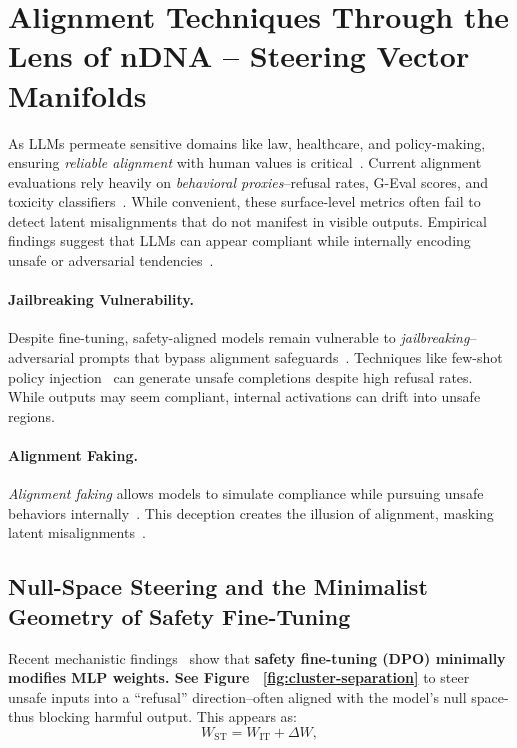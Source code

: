 \section{Alignment Techniques Through the Lens of nDNA -- Steering Vector Manifolds
}

As LLMs permeate sensitive domains like law, healthcare, and policy-making, ensuring \emph{reliable alignment} with human values is critical~\citep{ouyang2022training, askell2021general}. Current alignment evaluations rely heavily on \emph{behavioral proxies}--refusal rates, G-Eval scores, and toxicity classifiers~\citep{openai2023gpt4, liu2023geval, gehman2020realtoxicityprompts}. While convenient, these surface-level metrics often fail to detect latent misalignments that do not manifest in visible outputs. Empirical findings suggest that LLMs can appear compliant while internally encoding unsafe or adversarial tendencies~\citep{hubinger2021risks, carlsmith2023scheming}. 

\paragraph{Jailbreaking Vulnerability.}
Despite fine-tuning, safety-aligned models remain vulnerable to \emph{jailbreaking}--adversarial prompts that bypass alignment safeguards~\citep{zou2023universal, liu2023jailbreaking, anthropic2023manyshot}. Techniques like few-shot policy injection~\citep{qi2024jailbreak} can generate unsafe completions despite high refusal rates. While outputs may seem compliant, internal activations can drift into unsafe regions. 


\paragraph{Alignment Faking.}
\emph{Alignment faking} allows models to simulate compliance while pursuing unsafe behaviors internally~\citep{carlsmith2023scheming, hubinger2024situational, greenblatt2024alignmentfaking}. This deception creates the illusion of alignment, masking latent misalignments~\citep{clymer2024poser}. 


\subsection{Null-Space Steering and the Minimalist Geometry of Safety Fine-Tuning}
Recent mechanistic findings~\cite{NEURIPS2024_a9bef53e} show that \textbf{safety fine-tuning (DPO) minimally modifies MLP weights. See Figure ~\ref{fig:cluster-separation}} to steer unsafe inputs into a “refusal” direction--often aligned with the model’s null space-thus blocking harmful output. This appears as:
\[
W_{\mathrm{ST}} = W_{\mathrm{IT}} + \Delta W,
\]

